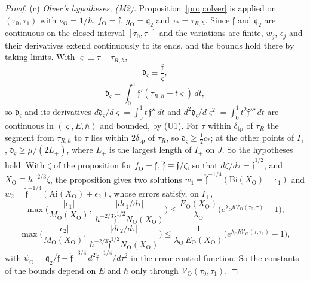 \documentclass[aps,prd,onecolumn,tightenlines,nofootinbib,notitlepage,11pt,floatfix]{revtex4-2}
\theoremstyle{indentedtheorem}
\begin{document}
\begin{proof}
(c) \emph{Olver's hypotheses, (M2).} Proposition~\ref{prop:olver} is applied on $(\tau_0,\tau_1)$ with $\nu_\text{O}=1/\hbar$, $f_\text{O}=\mathfrak{f}$, $g_\text{O}=\mathfrak{q}_2$ and $\tau_*=\tau_{R,\hbar}$. Since $\mathfrak{f}$ and $\mathfrak{q}_2$ are continuous on the closed interval $[\tau_0,\tau_1]$ and the variations are finite, $w_j$, $\epsilon_j$ and their derivatives extend continuously to its ends, and the bounds hold there by taking limits. With $\varsigma\equiv\tau-\tau_{R,\hbar}$,
\begin{equation*}
    \mathfrak{d}_\varsigma \equiv \frac{\mathfrak{f}}{\varsigma} ,
\end{equation*}
\begin{equation*}
    \mathfrak{d}_\varsigma = \int_0^1\mathfrak{f}'(\tau_{R,\hbar}+t\varsigma)\,dt ,
\end{equation*}
so $\mathfrak{d}_\varsigma$ and its derivatives $d\mathfrak{d}_\varsigma/d\varsigma=\int_0^1t\,\mathfrak{f}''\,dt$ and $d^2\mathfrak{d}_\varsigma/d\varsigma^2=\int_0^1t^2\mathfrak{f}'''\,dt$ are continuous in $(\varsigma,E,\hbar)$ and bounded, by (U1). For $\tau$ within $\delta_\text{tp}$ of $\tau_R$ the segment from $\tau_{R,\hbar}$ to $\tau$ lies within $2\delta_\text{tp}$ of $\tau_R$, so $\mathfrak{d}_\varsigma\geq\tfrac{1}{2}c_*$; at the other points of $I_+$, $\mathfrak{d}_\varsigma\geq\mu/(2L_+)$, where $L_+$ is the largest length of $I_+$ on $J$. So the hypotheses hold. With $\zeta$ of the proposition for $f_\text{O}=\mathfrak{f}$, $\hat{\mathfrak{f}}\equiv\mathfrak{f}/\zeta$, so that $d\zeta/d\tau=\hat{\mathfrak{f}}^{1/2}$, and $X_\text{O}\equiv\hbar^{-2/3}\zeta$, the proposition gives two solutions $w_1=\hat{\mathfrak{f}}^{-1/4}(\mathrm{Bi}(X_\text{O})+\epsilon_1)$ and $w_2=\hat{\mathfrak{f}}^{-1/4}(\mathrm{Ai}(X_\text{O})+\epsilon_2)$, whose errors satisfy, on $I_+$,
\begin{equation*}
    \max\Big(\frac{|\epsilon_1|}{M_\text{O}(X_\text{O})},\,\frac{|d\epsilon_1/d\tau|}{\hbar^{-2/3}\hat{\mathfrak{f}}^{1/2}N_\text{O}(X_\text{O})}\Big) \leq \frac{E_\text{O}(X_\text{O})}{\lambda_\text{O}}\Big(e^{\lambda_\text{O}\hbar\mathcal{V}_\text{O}(\tau_0,\tau)}-1\Big) ,
\end{equation*}
\begin{equation*}
    \max\Big(\frac{|\epsilon_2|}{M_\text{O}(X_\text{O})},\,\frac{|d\epsilon_2/d\tau|}{\hbar^{-2/3}\hat{\mathfrak{f}}^{1/2}N_\text{O}(X_\text{O})}\Big) \leq \frac{1}{\lambda_\text{O}\,E_\text{O}(X_\text{O})}\Big(e^{\lambda_\text{O}\hbar\mathcal{V}_\text{O}(\tau,\tau_1)}-1\Big) ,
\end{equation*}
with $\psi_\text{O}=\mathfrak{q}_2/\hat{\mathfrak{f}}-\hat{\mathfrak{f}}^{-3/4}\,d^2\hat{\mathfrak{f}}^{-1/4}/d\tau^2$ in the error-control function. So the constants of the bounds depend on $E$ and $\hbar$ only through $\mathcal{V}_\text{O}(\tau_0,\tau_1)$.


\end{proof}
\end{document}
